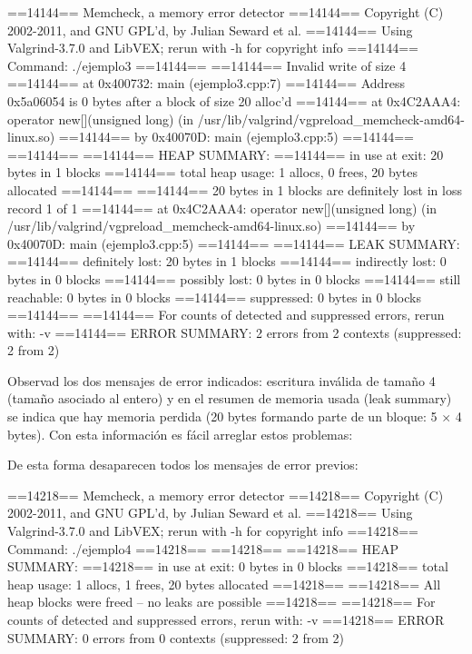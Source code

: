 \documentclass[11pt,a4paper,professionalfonts]{article}
\begin{document}
\vspace{0.4cm}
\begin{javacode}
==14144== Memcheck, a memory error detector
==14144== Copyright (C) 2002-2011, and GNU GPL'd, by Julian Seward et al.
==14144== Using Valgrind-3.7.0 and LibVEX; rerun with -h for copyright info
==14144== Command: ./ejemplo3
==14144== 
==14144== Invalid write of size 4
==14144==    at 0x400732: main (ejemplo3.cpp:7)
==14144==  Address 0x5a06054 is 0 bytes after a block of size 20 alloc'd
==14144==    at 0x4C2AAA4: operator new[](unsigned long) (in /usr/lib/valgrind/vgpreload_memcheck-amd64-linux.so)
==14144==    by 0x40070D: main (ejemplo3.cpp:5)
==14144== 
==14144== 
==14144== HEAP SUMMARY:
==14144==     in use at exit: 20 bytes in 1 blocks
==14144==   total heap usage: 1 allocs, 0 frees, 20 bytes allocated
==14144== 
==14144== 20 bytes in 1 blocks are definitely lost in loss record 1 of 1
==14144==    at 0x4C2AAA4: operator new[](unsigned long) (in /usr/lib/valgrind/vgpreload_memcheck-amd64-linux.so)
==14144==    by 0x40070D: main (ejemplo3.cpp:5)
==14144== 
==14144== LEAK SUMMARY:
==14144==    definitely lost: 20 bytes in 1 blocks
==14144==    indirectly lost: 0 bytes in 0 blocks
==14144==      possibly lost: 0 bytes in 0 blocks
==14144==    still reachable: 0 bytes in 0 blocks
==14144==         suppressed: 0 bytes in 0 blocks
==14144== 
==14144== For counts of detected and suppressed errors, rerun with: -v
==14144== ERROR SUMMARY: 2 errors from 2 contexts (suppressed: 2 from 2)
\end{javacode}
\vspace{0.4cm}


Observad los dos mensajes de error indicados: escritura inválida de tamaño 4
(tamaño asociado al entero) y en el resumen de memoria usada (leak summary) se 
indica que hay memoria perdida (20 bytes formando parte de un bloque: 
5 $\times$ 4 bytes). Con esta información es fácil arreglar estos problemas:



De esta forma desaparecen todos los mensajes de error previos:

\vspace{0.4cm}
\begin{javacode}
==14218== Memcheck, a memory error detector
==14218== Copyright (C) 2002-2011, and GNU GPL'd, by Julian Seward et al.
==14218== Using Valgrind-3.7.0 and LibVEX; rerun with -h for copyright info
==14218== Command: ./ejemplo4
==14218== 
==14218== 
==14218== HEAP SUMMARY:
==14218==     in use at exit: 0 bytes in 0 blocks
==14218==   total heap usage: 1 allocs, 1 frees, 20 bytes allocated
==14218== 
==14218== All heap blocks were freed -- no leaks are possible
==14218== 
==14218== For counts of detected and suppressed errors, rerun with: -v
==14218== ERROR SUMMARY: 0 errors from 0 contexts (suppressed: 2 from 2)
\end{javacode}
\vspace{0.4cm}
\end{document}
